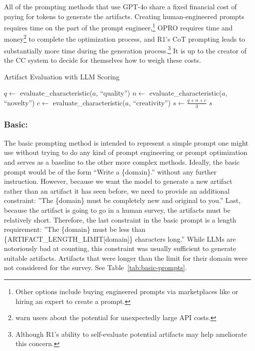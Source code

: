 \documentclass[phd,electronic,oneside,twosidetoc,letterpaper,chaptercenter,parttop,lof]{byumsphd}
\begin{document}
All of the prompting methods that use GPT-4o share a fixed financial cost of paying for tokens to generate the artifacts. Creating human-engineered prompts requires time on the part of the prompt engineer,\footnote{Other options include buying engineered prompts via marketplaces like \citeauthor{promptbase} or hiring an expert to create a prompt.} OPRO requires time and money\footnote{\citeauthor{yang2024opro} warn users about the potential for unexpectedly large API costs.} to complete the optimization process, and R1's CoT prompting leads to substantially more time during the generation process.\footnote{Although R1's ability to self-evaluate potential artifacts may help ameliorate this concern.} It is up to the creator of the CC system to decide for themselves how to weigh these costs.

\begin{algorithm}[t]
\caption{Artifact Evaluation with LLM Scoring}
\label{alg:artifact-eval-detailed}
\SetAlgoLined
\DontPrintSemicolon
{}



$q \leftarrow$ evaluate\_characteristic($a$, ``quality'')\;
$n \leftarrow$ evaluate\_characteristic($a$, ``novelty'')\;
$c \leftarrow$ evaluate\_characteristic($a$, ``creativity'')\;
$s \leftarrow \frac{q + n + c}{3}$\;
\Return $s$\;
\end{algorithm}

\subsubsection{Basic: }The basic prompting method is intended to represent a simple prompt one might use without trying to do any kind of prompt engineering or prompt optimization and serves as a baseline to the other more complex methods. Ideally, the basic prompt would be of the form ``Write a \{domain\}.'' without any further instruction. However, because we want the model to generate a new artifact rather than an artifact it has seen before, we need to provide an additional constraint: ''The \{domain\} must be completely new and original to you.'' Last, because the artifact is going to go in a human survey, the artifacts must be relatively short. Therefore, the last constraint in the basic prompt is a length requirement: ''The \{domain\} must be less than \{ARTIFACT\_LENGTH\_LIMIT[domain]\} characters long.'' While LLMs are notoriously bad at counting, this constraint was usually sufficient to generate suitable artifacts. Artifacts that were longer than the limit for their domain were not considered for the survey. See Table~\ref{tab:basic-prompts}.
\end{document}
